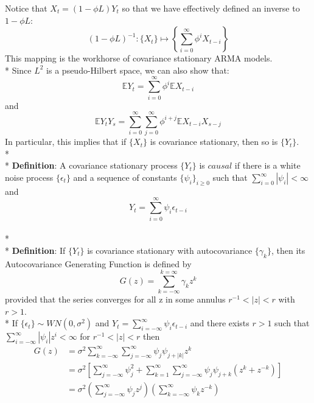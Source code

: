 \documentclass[11pt]{article}
\begin{document}
Notice that $X_t = \left( 1 - \phi L \right) Y_t$ so that we have effectively defined an inverse to $1-\phi L$:
\begin{equation}
\left( 1 - \phi L \right)^{-1} : \{ X_t \} \mapsto \left\{ \sum_{i=0}^{\infty} \phi^i X_{t-i} \right\}
\end{equation}
This mapping is the workhorse of covariance stationary ARMA models.
\\*
Since $L^2$ is a pseudo-Hilbert space, we can also show that:
$$\mathbb{E} Y_t = \sum_{i=0}^\infty \phi^i \mathbb{E} X_{t-i}$$
and
$$\mathbb{E} Y_t Y_s = \sum_{i=0}^\infty \sum_{j=0}^\infty \phi^{i+j} \mathbb{E} X_{t-i} X_{s-j}$$
In particular, this implies that if $\{ X_t \}$ is covariance stationary, then so is $\{ Y_t \}$.
\\*
\\*
{\bf Definition}: A covariance stationary process $\{ Y_t \}$ is $causal$ if there is a white noise process $\{ \epsilon_t \}$ and a sequence of constants $\{ \psi_i \}_{i \geq 0}$ such that $\sum_{i = 0}^{\infty} | \psi_i | < \infty$ and
\begin{equation}
Y_t = \sum_{i=0}^{\infty} \psi_i \epsilon_{t-i}
\end{equation}
\\*
\\*
{\bf Definition}: If $\{ Y_t \}$ is covariance stationary with autocovariance $\{ \gamma_k \}$, then its Autocovariance Generating Function is defined by
\begin{equation}
G \left( z \right) = \sum_{k=- \infty}^{k = \infty} \gamma_k z^k
\end{equation}
provided that the series converges for all z in some annulus $r^{-1} < |z| < r$ with $r > 1$.
\\*
If $\{ \epsilon_t \} \sim WN \left( 0, \sigma^2 \right)$ and $Y_t = \sum_{i = - \infty}^{\infty} \psi_i \epsilon_{t-i}$ and there exists $r > 1$ such that $\sum_{i= - \infty}^{\infty} | \psi_i | z^i < \infty$ for $r^{-1} < | z| <r$ then
\begin{equation}
\begin{split}
G \left( z \right) & = \sigma^2 \sum_{k=-\infty}^{\infty} \sum_{j=-\infty}^{\infty} \psi_j \psi_{j + |k|} z^k \\
& = \sigma^2 \left[ \sum_{j=-\infty}^{\infty} \psi_j^2 + \sum_{k=1}^{\infty} \sum_{j=-\infty}^{\infty} \psi_j \psi_{j+k} \left( z^k + z^{-k} \right) \right] \\
& = \sigma^2 \left( \sum_{j=-\infty}^{\infty} \psi_j z^j \right)
\left( \sum_{k=-\infty}^{\infty} \psi_k z^{-k} \right)
\end{split}
\end{equation}
\end{document}
